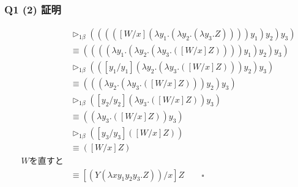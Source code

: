 \begin{frame}
    \frametitle{Q1 (2) 証明}
    \begin{align*}
        &\rhd_{1\beta} (((([W/x](\lambda y_1.(\lambda y_2.(\lambda y_3.Z))))y_1)y_2)y_3) \\
        &\equiv ((((\lambda y_1.(\lambda y_2.(\lambda y_3.([W/x]Z))))y_1)y_2)y_3) \\
        &\rhd_{1\beta} (([y_1/y_1](\lambda y_2.(\lambda y_3.([W/x]Z)))y_2)y_3) \\
        &\equiv (((\lambda y_2.(\lambda y_3.([W/x]Z)))y_2)y_3) \\
        &\rhd_{1\beta} ([y_2/y_2](\lambda y_3.([W/x]Z))y_3) \\
        &\equiv ((\lambda y_3.([W/x]Z))y_3) \\
        &\rhd_{1\beta} ([y_3/y_3]([W/x]Z)) \\
        &\equiv ([W/x]Z) \\
        W \text{を直すと}\\
        &\equiv [(Y(\lambda xy_1y_2y_3.Z))/x]Z \qquad \square\\
    \end{align*}
    
\end{frame}